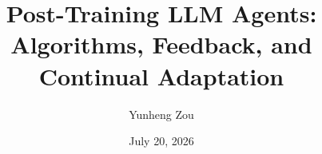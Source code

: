 \title{Post-Training LLM Agents:\\
Algorithms, Feedback, and Continual Adaptation}
\author{Yunheng Zou}
\date{July 20, 2026}
